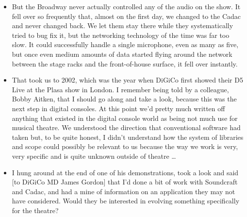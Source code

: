 \documentclass[12pt]{article}
\begin{document}
\begin{itemize}
            \item But the Broadway never actually controlled any of the audio on the show. It fell over so frequently that, almost on the first day, we changed to the Cadac and never changed back. We let them stay there while they systematically tried to bug fix it, but the networking technology of the time was far too slow. It could successfully handle a single microphone, even as many as five, but once even medium amounts of data started flying around the network between the stage racks and the front-of-house surface, it fell over instantly.
            \item That took us to 2002, which was the year when DiGiCo first showed their D5 Live at the Plasa show in London. I remember being told by a colleague, Bobby Aitken, that I should go along and take a look, because this was the next step in digital consoles. At this point we'd pretty much written off anything that existed in the digital console world as being not much use for musical theatre. We understood the direction that conventional software had taken but, to be quite honest, I didn’t understand how the system of libraries and scope could possibly be relevant to us because the way we work is very, very specific and is quite unknown outside of theatre \dots
            \item I hung around at the end of one of his demonstrations, took a look and said [to DiGiCo MD James Gordon] that I'd done a bit of work with Soundcraft and Cadac, and had a mine of information on an application they may not have considered. Would they be interested in evolving something specifically for the theatre?
        \end{itemize}
        \newpage
\end{document}
